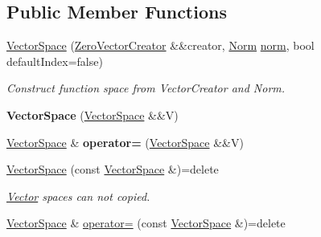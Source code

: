 \subsection*{Public Member Functions}
\begin{DoxyCompactItemize}
\item 
\hyperlink{classSpacy_1_1VectorSpace_aa4f30986a1b977cf7f0abc27e0c9872d}{Vector\-Space} (\hyperlink{classSpacy_1_1ZeroVectorCreator}{Zero\-Vector\-Creator} \&\&creator, \hyperlink{namespaceSpacy_a0dbe77a4e1282ef88017e94d50d17791}{Norm} \hyperlink{classSpacy_1_1VectorSpace_a2f26e33994544a37a83e6938a748ab8c}{norm}, bool default\-Index=false)
\begin{DoxyCompactList}\small\item\em Construct function space from Vector\-Creator and Norm. \end{DoxyCompactList}\item 
\hypertarget{classSpacy_1_1VectorSpace_a2bc6444dc35de9fe68d7a8156c03125f}{{\bfseries Vector\-Space} (\hyperlink{classSpacy_1_1VectorSpace}{Vector\-Space} \&\&V)}\label{classSpacy_1_1VectorSpace_a2bc6444dc35de9fe68d7a8156c03125f}

\item 
\hypertarget{classSpacy_1_1VectorSpace_a5c43f6cca9f16ee3839e813633f87370}{\hyperlink{classSpacy_1_1VectorSpace}{Vector\-Space} \& {\bfseries operator=} (\hyperlink{classSpacy_1_1VectorSpace}{Vector\-Space} \&\&V)}\label{classSpacy_1_1VectorSpace_a5c43f6cca9f16ee3839e813633f87370}

\item 
\hypertarget{classSpacy_1_1VectorSpace_ae8f3f22a43fcc418c447b5f49568d54e}{\hyperlink{classSpacy_1_1VectorSpace_ae8f3f22a43fcc418c447b5f49568d54e}{Vector\-Space} (const \hyperlink{classSpacy_1_1VectorSpace}{Vector\-Space} \&)=delete}\label{classSpacy_1_1VectorSpace_ae8f3f22a43fcc418c447b5f49568d54e}

\begin{DoxyCompactList}\small\item\em \hyperlink{classSpacy_1_1Vector}{Vector} spaces can not copied. \end{DoxyCompactList}\item 
\hypertarget{classSpacy_1_1VectorSpace_a30d39a339ed924a6c17c85d75f64afc4}{\hyperlink{classSpacy_1_1VectorSpace}{Vector\-Space} \& \hyperlink{classSpacy_1_1VectorSpace_a30d39a339ed924a6c17c85d75f64afc4}{operator=} (const \hyperlink{classSpacy_1_1VectorSpace}{Vector\-Space} \&)=delete}\label{classSpacy_1_1VectorSpace_a30d39a339ed924a6c17c85d75f64afc4}


\end{DoxyCompactItemize}
